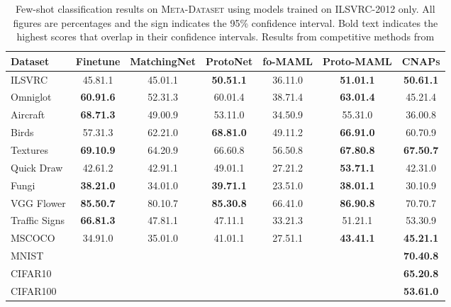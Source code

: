 \documentclass{article}
\theoremstyle{definition}
\newcommand{\cnaps}{\textsc{CNAPs}}
\begin{document}
\begin{table}[t]
\caption{Few-shot classification results on \textsc{Meta-Dataset} \citep{triantafillou2019meta} using models trained on ILSVRC-2012 only. All figures are percentages and the  sign indicates the 95\% confidence interval. Bold text indicates the highest scores that overlap in their confidence intervals. Results from competitive methods from \citep{triantafillou2019meta}}
\label{table:meta_dataset_results_imagenet}
\small
\centering
\begin{tabular}{@{}lcccccc@{}}
\toprule
Dataset                                   & Finetune              & MatchingNet  & ProtoNet              & fo-MAML      & Proto-MAML            & \cnaps                \\
\midrule
ILSVRC \citep{russakovsky2015imagenet}    & 45.81.1          & 45.01.1 & \textbf{50.51.1} & 36.11.0 & \textbf{51.01.1} & \textbf{50.61.1} \\
\hdashline
Omniglot \citep{lake2011one}              & \textbf{60.91.6}          & 52.31.3 & 60.01.4          & 38.71.4 & \textbf{63.01.4} & 45.21.4          \\
Aircraft \citep{maji2013fine}             & \textbf{68.71.3} & 49.00.9 & 53.11.0          & 34.50.9 & 55.31.0          & 36.00.8          \\
Birds \citep{wah2011caltech}              & 57.31.3          & 62.21.0 & \textbf{68.81.0} & 49.11.2 & \textbf{66.91.0} & 60.70.9          \\
Textures \citep{cimpoi2014describing}     & \textbf{69.10.9} & 64.20.9 & 66.60.8          & 56.50.8 & \textbf{67.80.8} & \textbf{67.50.7} \\
Quick Draw \citep{ha2017neural}           & 42.61.2          & 42.91.1 & 49.01.1          & 27.21.2 & \textbf{53.71.1} & 42.31.0          \\
Fungi \citep{Schroeder2018FGVCx}          & \textbf{38.21.0} & 34.01.0 & \textbf{39.71.1} & 23.51.0 & \textbf{38.01.1} & 30.10.9          \\
VGG Flower \citep{nilsback2008automated}  & \textbf{85.50.7} & 80.10.7 & \textbf{85.30.8} & 66.41.0 & \textbf{86.90.8} & 70.70.7          \\
Traffic Signs \citep{houben2013detection} & \textbf{66.81.3} & 47.81.1 & 47.11.1          & 33.21.3 & 51.21.1          & 53.30.9          \\
MSCOCO \citep{lin2014microsoft}           & 34.91.0          & 35.01.0 & 41.01.1          & 27.51.1 & \textbf{43.41.1} & \textbf{45.21.1} \\
MNIST \citep{lecun2010mnist}              &                       &              &                       &              &                       & \textbf{70.40.8} \\
CIFAR10 \citep{krizhevsky2009learning}    &                       &              &                       &              &                       & \textbf{65.20.8} \\
CIFAR100 \citep{krizhevsky2009learning}   &                       &              &                       &              &                       & \textbf{53.61.0} \\
\bottomrule
\end{tabular}
\end{table}
\end{document}
